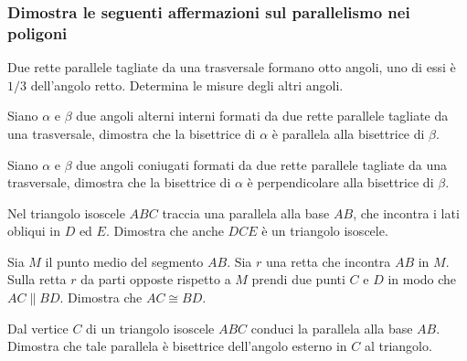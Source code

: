 \newpage %

\subsubsection*{Dimostra le seguenti affermazioni sul parallelismo 
nei poligoni}

\vspace{-6pt}

\begin{multicols}{2}

\begin{esercizio}
  \label{ese:3.39}
  Due rette parallele tagliate da una trasversale formano otto angoli, 
  uno di essi è $1/3$ dell'angolo retto. Determina le misure degli 
  altri angoli.
\end{esercizio}

\begin{esercizio}
  \label{ese:3.40}
  Siano $\alpha$ e $\beta$ due angoli alterni interni formati da due 
  rette parallele tagliate da una trasversale, dimostra che la 
  bisettrice di $\alpha$ è parallela alla bisettrice di $\beta$.
\end{esercizio}

\begin{esercizio}
  \label{ese:3.41}
  Siano $\alpha$ e $\beta$ due angoli coniugati formati da due rette 
  parallele tagliate da una trasversale, dimostra che la bisettrice di 
  $\alpha$ è perpendicolare alla bisettrice di $\beta$.
\end{esercizio}

\begin{esercizio}
\label{ese:3.24}
Nel triangolo isoscele $ABC$ traccia una parallela alla base $AB$, 
che incontra i lati obliqui in $D$ ed $E$. Dimostra che anche $DCE$ è 
un triangolo isoscele.
\end{esercizio}

\begin{esercizio}
\label{ese:3.26}
Sia $M$ il punto medio del segmento $AB$. Sia $r$ una retta che 
incontra $AB$ in $M$. Sulla retta $r$ da parti opposte rispetto a $M$ 
prendi due punti $C$ e $D$ in modo che $AC\parallel BD$. Dimostra che 
$AC\cong BD$. 
\end{esercizio}

\begin{esercizio}
\label{ese:3.27}
Dal vertice $C$ di un triangolo isoscele $ABC$ conduci la parallela 
alla base $AB$. Dimostra che tale parallela è bisettrice dell'angolo 
esterno in $C$ al triangolo.
\end{esercizio}


\end{multicols}
